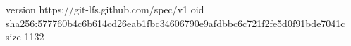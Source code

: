 version https://git-lfs.github.com/spec/v1
oid sha256:577760b4c6b614cd26eab1fbc34606790e9afdbbc6c721f2fe5d0f91bde7041c
size 1132
